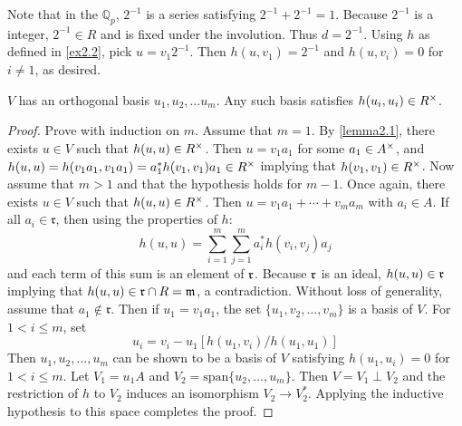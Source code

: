 \begin{example}
Note that in the $\mathbb{Q}_p$, $2^{-1}$ is a series satisfying $2^{-1} + 2^{-1} = 1$.
Because $2^{-1}$ is a \padic integer, $2^{-1} \in R$ and is fixed under the involution.
Thus $d = 2^{-1}$.
Using $h$ as defined in \cref{ex2.2}, pick $u = v_1 2^{-1}$.
Then $h(u, v_1) = 2^{-1}$ and $h(u, v_i) = 0$ for $i \ne 1$, as desired.
\end{example}

\begin{lemma}\label{lemma2.2}
$V$ has an orthogonal basis $u_1, u_2, \dotsc u_m$.
Any such basis satisfies $h(u_i, u_i) \in R^\times$.
\end{lemma}
\begin{proof}
Prove with induction on $m$.
Assume that $m = 1$.
By \cref{lemma2.1}, there exists $u \in V$ such that $h(u,u) \in R^\times$.
Then $u = v_1a_1$ for some $a_1 \in A^\times$, and $h(u,u) = h(v_1a_1, v_1a_1) = a_1^*h(v_1,v_1)a_1 \in R^\times$ implying that $h(v_1, v_1) \in R^\times$.
Now assume that $m > 1$ and that the hypothesis holds for $m - 1$.
Once again, there exists $u \in V$ such that $h(u,u) \in R^\times$.
Then $u = v_1a_1 + \dotsb + v_m a_m$ with $a_i \in A$.
If all $a_i \in \mathfrak{r}$, then using the properties of $h$:
\[
h(u,u) = \sum_{i=1}^m \sum_{j=1}^m a_i^* h(v_i, v_j) a_j
\]
and each term of this sum is an element of $\mathfrak{r}$.
Because $\mathfrak{r}$ is an ideal, $h(u,u) \in \mathfrak{r}$ implying that $h(u,u) \in \mathfrak{r} \cap R = \mathfrak{m}$, a contradiction.
Without loss of generality, assume that $a_1 \not\in \mathfrak{r}$.
Then if $u_1 = v_1 a_1$, the set $\{u_1, v_2, \dotsc, v_m\}$ is a basis of $V$.
For $1 < i \le m$, set
\[
u_i = v_i - u_1[h(u_1,v_i)/h(u_1, u_1)]
\]
Then $u_1, u_2, \dotsc, u_m$ can be shown to be a basis of $V$ satisfying $h(u_1, u_i) = 0$ for $1 < i \le m$.
Let $V_1 = u_1 A$ and $V_2 = \text{span} \{u_2, \dotsc, u_m\}$.
Then $V = V_1 \perp V_2$ and the restriction of $h$ to $V_2$ induces an isomorphism $V_2 \to V_2^*$.
Applying the inductive hypothesis to this space completes the proof.
\end{proof}

